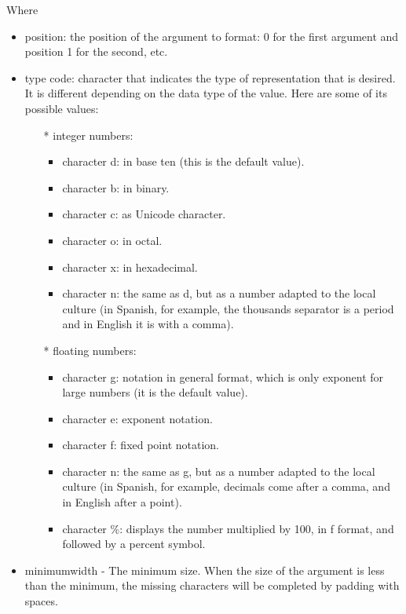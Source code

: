   
Where
\begin{itemize}
\item position: the position of the argument to format:
0 for the first argument and position 1 for the second, etc.

\item type code: character that indicates the type of representation that is desired. It is different depending on the data type of the value. Here are some of its possible values:
\begin{itemize}
\item[*] integer numbers:
\begin{itemize}
\item character d: in base ten (this is the default value).
\item character b: in binary.
\item character c: as Unicode character.
\item character o: in octal.
\item character x: in hexadecimal.
\item character n: the same as d, but as a number adapted to the local culture (in Spanish, for example, the thousands separator is a period and in English it is with a comma).
\end{itemize}
\item[*] floating numbers:
\begin{itemize}
\item  character g: notation in general format, which is only exponent for large numbers (it is the default value).

\item  character e: exponent notation.

\item  character f: fixed point notation.

\item  character n: the same as g, but as a number adapted to the local culture (in Spanish, for example, decimals come after a comma, and in English after a point).

\item  character \%: displays the number multiplied by 100, in f format, and followed by a percent symbol.
\end{itemize}
\end{itemize}


\item minimumwidth - The minimum size. When the size of the argument is less than the minimum, the missing characters will be completed by padding with spaces.


\end{itemize}
